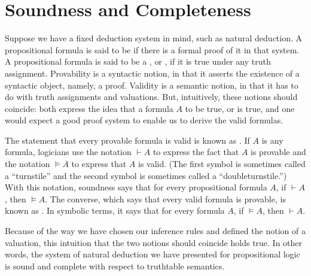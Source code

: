 \documentclass[letterpaper,10pt,english]{sphinxmanual}
\begin{document}
\section{Soundness and Completeness}
\label{\detokenize{semantics_of_propositional_logic:soundness-and-completeness}}
\sphinxAtStartPar
Suppose we have a fixed deduction system in mind, such as natural deduction. A propositional formula is said to be  if there is a formal proof of it in that system. A propositional formula is said to be a , or , if it is true under any truth assignment. Provability is a syntactic notion, in that it asserts the existence of a syntactic object, namely, a proof. Validity is a semantic notion, in that it has to do with truth assignments and valuations. But, intuitively, these notions should coincide: both express the idea that a formula \(A\)  to be true, or is  true, and one would expect a good proof system to enable us to derive the valid formulas.

\sphinxAtStartPar
The statement that every provable formula is valid is known as . If \(A\) is any formula, logicians use the notation \(\vdash A\) to express the fact that \(A\) is provable and the notation \(\vDash A\) to express that \(A\) is valid. (The first symbol is sometimes called a “turnstile” and the second symbol is sometimes called a “double\sphinxhyphen{}turnstile.”) With this notation, soundness says that for every propositional formula \(A\), if \(\vdash A\), then \(\vDash A\). The converse, which says that every valid formula is provable, is known as . In symbolic terms, it says that for every formula \(A\), if \(\vDash A\), then \(\vdash A\).

\sphinxAtStartPar
Because of the way we have chosen our inference rules and defined the notion of a valuation, this intuition that the two notions should coincide holds true. In other words, the system of natural deduction we have presented for propositional logic is sound and complete with respect to truth\sphinxhyphen{}table semantics.
\end{document}
